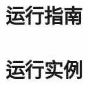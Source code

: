 \documentclass[UTF8]{article}
\begin{document}
    \section{运行指南}


    \section{运行实例}
    




        
    
\end{document}
